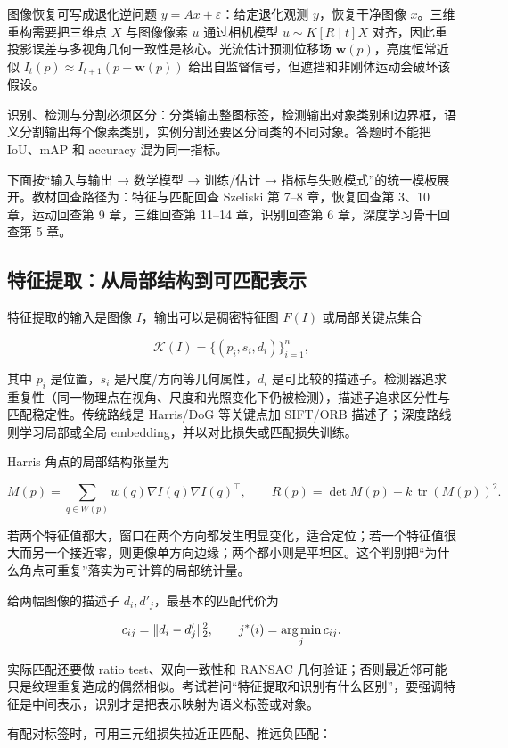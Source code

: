 \documentclass[11pt]{ctexart}
\begin{document}
图像恢复可写成退化逆问题 \(y=Ax+\varepsilon\)：给定退化观测 \(y\)，恢复干净图像 \(x\)。三维重构需要把三维点 \(X\) 与图像像素 \(u\) 通过相机模型 \(u\sim K[R\mid t]X\) 对齐，因此重投影误差与多视角几何一致性是核心。光流估计预测位移场 \(\mathbf w(p)\)，亮度恒常近似 \(I_t(p)\approx I_{t+1}(p+\mathbf w(p))\) 给出自监督信号，但遮挡和非刚体运动会破坏该假设。

识别、检测与分割必须区分：分类输出整图标签，检测输出对象类别和边界框，语义分割输出每个像素类别，实例分割还要区分同类的不同对象。答题时不能把 IoU、mAP 和 accuracy 混为同一指标。

下面按“输入与输出 → 数学模型 → 训练/估计 → 指标与失败模式”的统一模板展开。教材回查路径为：特征与匹配回查 Szeliski 第 7--8 章，恢复回查第 3、10 章，运动回查第 9 章，三维回查第 11--14 章，识别回查第 6 章，深度学习骨干回查第 5 章。

\subsection{特征提取：从局部结构到可匹配表示}

特征提取的输入是图像 \(I\)，输出可以是稠密特征图 \(F(I)\) 或局部关键点集合

\[
  \mathcal{K}(I)=\{(p_i,s_i,d_i)\}_{i=1}^{n},
\]

其中 \(p_i\) 是位置，\(s_i\) 是尺度/方向等几何属性，\(d_i\) 是可比较的描述子。检测器追求重复性（同一物理点在视角、尺度和光照变化下仍被检测），描述子追求区分性与匹配稳定性。传统路线是 Harris/DoG 等关键点加 SIFT/ORB 描述子；深度路线则学习局部或全局 embedding，并以对比损失或匹配损失训练。

Harris 角点的局部结构张量为

\[
  M(p)=\sum_{q\in W(p)} w(q)\nabla I(q)\nabla I(q)^\top,
  \qquad
  R(p)=\det M(p)-k\,\operatorname{tr}(M(p))^2.
\]

若两个特征值都大，窗口在两个方向都发生明显变化，适合定位；若一个特征值很大而另一个接近零，则更像单方向边缘；两个都小则是平坦区。这个判别把“为什么角点可重复”落实为可计算的局部统计量。

给两幅图像的描述子 \(d_i,d'_j\)，最基本的匹配代价为

\[
  c_{ij}=\|d_i-d'_j\|_2^2,
  \qquad
  j^*(i)=\operatorname*{arg\,min}_j c_{ij}.
\]

实际匹配还要做 ratio test、双向一致性和 RANSAC 几何验证；否则最近邻可能只是纹理重复造成的偶然相似。考试若问“特征提取和识别有什么区别”，要强调特征是中间表示，识别才是把表示映射为语义标签或对象。

有配对标签时，可用三元组损失拉近正匹配、推远负匹配：
\end{document}
